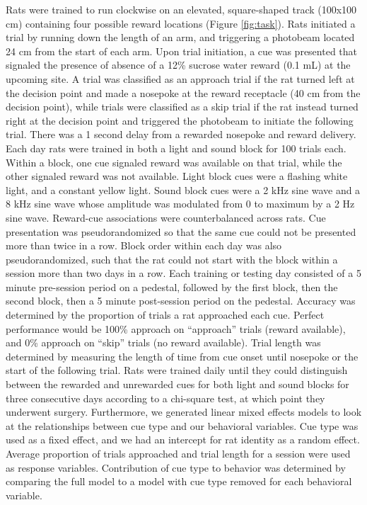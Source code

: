 \documentclass[11pt]{article}
\begin{document}
Rats were trained to run clockwise on an elevated, square-shaped track (100x100 cm) containing four possible reward locations (Figure \ref{fig:task}). Rats initiated a trial by running down the length of an arm, and triggering a photobeam located 24 cm from the start of each arm. Upon trial initiation, a cue was presented that signaled the presence of absence of a 12\% sucrose water reward (0.1 mL) at the upcoming site. A trial was classified as an approach trial if the rat turned left at the decision point and made a nosepoke at the reward receptacle (40 cm from the decision point), while trials were classified as a skip trial if the rat instead turned right at the decision point and triggered the photobeam to initiate the following trial. There was a 1 second delay from a rewarded nosepoke and reward delivery. Each day rats were trained in both a light and sound block for 100 trials each. Within a block, one cue signaled reward was available on that trial, while the other signaled reward was not available. Light block cues were a flashing white light, and a constant yellow light. Sound block cues were a 2 kHz sine wave and a 8 kHz sine wave whose amplitude was modulated from 0 to maximum by a 2 Hz sine wave. Reward-cue associations were counterbalanced across rats. Cue presentation was pseudorandomized so that the same cue could not be presented more than twice in a row. Block order within each day was also pseudorandomized, such that the rat could not start with the block within a session more than two days in a row. Each training or testing day consisted of a 5 minute pre-session period on a pedestal, followed by the first block, then the second block, then a 5 minute post-session period on the pedestal. Accuracy was determined by the proportion of trials a rat approached each cue. Perfect performance would be 100\% approach on “approach” trials (reward available), and 0\% approach on “skip” trials (no reward available). Trial length was determined by measuring the length of time from cue onset until nosepoke or the start of the following trial. Rats were trained daily until they could distinguish between the rewarded and unrewarded cues for both light and sound blocks for three consecutive days according to a chi-square test, at which point they underwent surgery. Furthermore, we generated linear mixed effects models to look at the relationships between cue type and our behavioral variables. Cue type was used as a fixed effect, and we had an intercept for rat identity as a random effect. Average proportion of trials approached and trial length for a session were used as response variables. Contribution of cue type to behavior was determined by comparing the full model to a model with cue type removed for each behavioral variable. 
\end{document}
